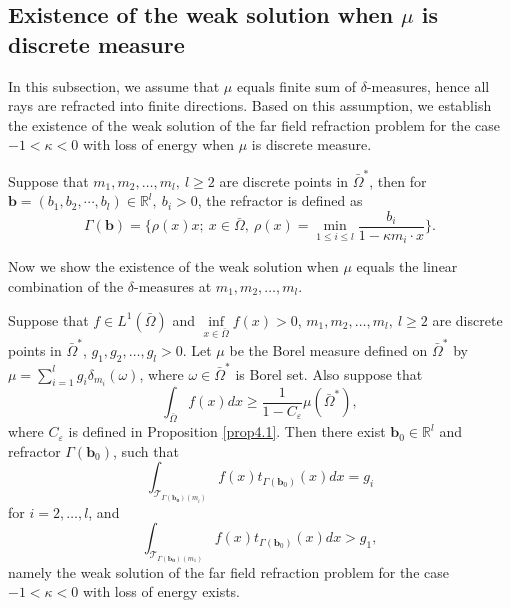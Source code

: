 \documentclass[a4paper,12pt,]{article}
\newtheorem{theorem}{\hskip\parindent\bf Theorem}[section]%
\newtheorem{remark}{\hskip\parindent\bf Remark}[section]%
\numberwithin{equation}{section}
\numberwithin{equation}{section} \allowdisplaybreaks
\begin{document}
\subsection{Existence of the weak solution when $\mu$ is discrete measure}

In this subsection, we assume that $\mu$ equals finite sum of $\delta$-measures, hence all rays are refracted into finite directions. Based on this assumption, we establish the existence of the weak solution of the far field refraction problem for the case $-1 < \kappa <0$ with loss of energy when $\mu$ is discrete measure.

\begin{remark}
  Suppose that $m_{1},m_{2},\ldots, m_{l},~l \geq 2$ are discrete points in $\bar{\Omega}^{\ast}$, then for $\mathbf{b} = (b_{1},b_{2},\cdots ,b_{l}) \in \mathbb{R}^{l},~b_{i}>0$, the refractor is defined as
  \begin{equation}\label{4.8}
    \Gamma(\mathbf{b}) = \{\rho(x)x;~x\in \bar{\Omega},~\rho(x)=\min_{1\leq i \leq l}\frac{b_{i}}{1 - \kappa m_{i}\cdot x}\}.
  \end{equation}
  \label{rem4.5}
\end{remark}

Now we show the existence of the weak solution when $\mu$ equals the linear combination of the $\delta$-measures at $m_{1},m_{2},\ldots, m_{l}$. 

\begin{theorem}
  Suppose that $f \in L^{1}(\bar{\Omega})$ and $\inf\limits_{x \in \bar{\Omega}}f(x)>0$, $m_{1},m_{2},\ldots, m_{l},~l \geq 2$ are discrete points in $\bar{\Omega}^{\ast}$, $g_{1}, g_{2}, \ldots, g_{l}>0$. Let $\mu$ be the Borel measure defined on $\bar{\Omega}^{\ast}$ by $\mu = \sum\limits_{i = 1}^{l}g_{i}\delta_{m_{i}}(\omega)$, where $\omega \in \bar{\Omega}^{\ast}$ is Borel set. Also suppose that $$\displaystyle\int_{\bar{\Omega}}f(x)dx \geq \dfrac{1}{1 - C_{\varepsilon}} \mu(\bar{\Omega}^{\ast}),$$ where $C_{\varepsilon}$ is defined in Proposition \ref{prop4.1}. Then there exist $\mathbf{b}_{0} \in \mathbb{R}^{l}$ and refractor $\Gamma(\mathbf{b}_{0})$, such that
  $$\int_{\mathcal{T}_{\Gamma{(\mathbf{b_{0}})}(m_{i})}}f(x)t_{\Gamma(\mathbf{b}_{0})}(x)dx = g_{i}$$
  for $i = 2,\ldots,l$, and
  $$\int_{\mathcal{T}_{\Gamma{(\mathbf{b_{0}})}(m_{1})}}f(x)t_{\Gamma(\mathbf{b}_{0})}(x)dx > g_{1},$$
  namely the weak solution of the far field refraction problem for the case $-1 < \kappa <0$ with loss of energy exists.
  \label{thm4.2}
\end{theorem}
\end{document}
